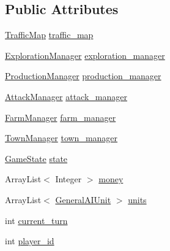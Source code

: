 \subsection*{Public Attributes}
\begin{DoxyCompactItemize}
\item 
\hyperlink{classai_1_1general_1_1_traffic_map}{TrafficMap} \hyperlink{classai_1_1general_1_1_general_a_i_a8815a09b03f98f9ec68742e32b9c472d}{traffic\_\-map}
\item 
\hyperlink{classai_1_1general_1_1_exploration_manager}{ExplorationManager} \hyperlink{classai_1_1general_1_1_general_a_i_acd7fe2fea4dd83aa8d17f6ba6120700a}{exploration\_\-manager}
\item 
\hyperlink{classai_1_1general_1_1_production_manager}{ProductionManager} \hyperlink{classai_1_1general_1_1_general_a_i_a36b95e1d1adbc36d26390f8da11bfe35}{production\_\-manager}
\item 
\hyperlink{classai_1_1general_1_1_attack_manager}{AttackManager} \hyperlink{classai_1_1general_1_1_general_a_i_a286b49649938c2d88dbe8705dac959ff}{attack\_\-manager}
\item 
\hyperlink{classai_1_1general_1_1_farm_manager}{FarmManager} \hyperlink{classai_1_1general_1_1_general_a_i_aac6a7b3f65ae27624edf09c9df39c8f7}{farm\_\-manager}
\item 
\hyperlink{classai_1_1general_1_1_town_manager}{TownManager} \hyperlink{classai_1_1general_1_1_general_a_i_a4430f889ec6dc11ca44711daec0d549b}{town\_\-manager}
\item 
\hyperlink{classrts_1_1_game_state}{GameState} \hyperlink{classai_1_1general_1_1_general_a_i_a3f311af8e06d47cb8b104d3ff4244484}{state}
\item 
ArrayList$<$ Integer $>$ \hyperlink{classai_1_1general_1_1_general_a_i_a64d51272ee8ee14e4b190ed943684465}{money}
\item 
ArrayList$<$ \hyperlink{classai_1_1general_1_1_general_a_i_unit}{GeneralAIUnit} $>$ \hyperlink{classai_1_1general_1_1_general_a_i_acc56ad41f2a1b117bd47a0c4e5da7a36}{units}
\item 
int \hyperlink{classai_1_1general_1_1_general_a_i_a53826321184783f1d220fd72be9a470c}{current\_\-turn}
\item 
int \hyperlink{classai_1_1general_1_1_general_a_i_a232c46c472f72f48ddc64152b6245ef1}{player\_\-id}
\end{DoxyCompactItemize}
